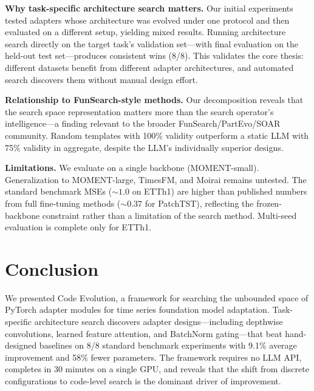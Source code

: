 \documentclass{article}
\begin{document}
\textbf{Why task-specific architecture search matters.} Our initial experiments tested adapters whose architecture was evolved under one protocol and then evaluated on a different setup, yielding mixed results. Running architecture search directly on the target task's validation set---with final evaluation on the held-out test set---produces consistent wins (8/8). This validates the core thesis: different datasets benefit from different adapter architectures, and automated search discovers them without manual design effort.

\textbf{Relationship to FunSearch-style methods.} Our decomposition reveals that the search space representation matters more than the search operator's intelligence---a finding relevant to the broader FunSearch/PartEvo/SOAR community. Random templates with 100\% validity outperform a static LLM with 75\% validity in aggregate, despite the LLM's individually superior designs.

\textbf{Limitations.} We evaluate on a single backbone (MOMENT-small). Generalization to MOMENT-large, TimesFM, and Moirai remains untested. The standard benchmark MSEs (${\sim}1.0$ on ETTh1) are higher than published numbers from full fine-tuning methods (${\sim}0.37$ for PatchTST), reflecting the frozen-backbone constraint rather than a limitation of the search method. Multi-seed evaluation is complete only for ETTh1.

\section{Conclusion}

We presented Code Evolution, a framework for searching the unbounded space of PyTorch adapter modules for time series foundation model adaptation. Task-specific architecture search discovers adapter designs---including depthwise convolutions, learned feature attention, and BatchNorm gating---that beat hand-designed baselines on 8/8 standard benchmark experiments with 9.1\% average improvement and 58\% fewer parameters. The framework requires no LLM API, completes in 30 minutes on a single GPU, and reveals that the shift from discrete configurations to code-level search is the dominant driver of improvement.
\end{document}
